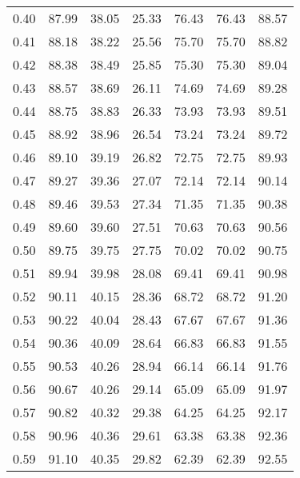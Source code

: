 \begin{tabular}{|c|c|c|c|c|c|c|}
      0.40 &     87.99 &     38.05 &      25.33 &   76.43 &      76.43 &         88.57 \\
      0.41 &     88.18 &     38.22 &      25.56 &   75.70 &      75.70 &         88.82 \\
      0.42 &     88.38 &     38.49 &      25.85 &   75.30 &      75.30 &         89.04 \\
      0.43 &     88.57 &     38.69 &      26.11 &   74.69 &      74.69 &         89.28 \\
      0.44 &     88.75 &     38.83 &      26.33 &   73.93 &      73.93 &         89.51 \\
      0.45 &     88.92 &     38.96 &      26.54 &   73.24 &      73.24 &         89.72 \\
      0.46 &     89.10 &     39.19 &      26.82 &   72.75 &      72.75 &         89.93 \\
      0.47 &     89.27 &     39.36 &      27.07 &   72.14 &      72.14 &         90.14 \\
      0.48 &     89.46 &     39.53 &      27.34 &   71.35 &      71.35 &         90.38 \\
      0.49 &     89.60 &     39.60 &      27.51 &   70.63 &      70.63 &         90.56 \\
      0.50 &     89.75 &     39.75 &      27.75 &   70.02 &      70.02 &         90.75 \\
      0.51 &     89.94 &     39.98 &      28.08 &   69.41 &      69.41 &         90.98 \\
      0.52 &     90.11 &     40.15 &      28.36 &   68.72 &      68.72 &         91.20 \\
      0.53 &     90.22 &     40.04 &      28.43 &   67.67 &      67.67 &         91.36 \\
      0.54 &     90.36 &     40.09 &      28.64 &   66.83 &      66.83 &         91.55 \\
      0.55 &     90.53 &     40.26 &      28.94 &   66.14 &      66.14 &         91.76 \\
      0.56 &     90.67 &     40.26 &      29.14 &   65.09 &      65.09 &         91.97 \\
      0.57 &     90.82 &     40.32 &      29.38 &   64.25 &      64.25 &         92.17 \\
      0.58 &     90.96 &     40.36 &      29.61 &   63.38 &      63.38 &         92.36 \\
      0.59 &     91.10 &     40.35 &      29.82 &   62.39 &      62.39 &         92.55 \\

\end{tabular}
